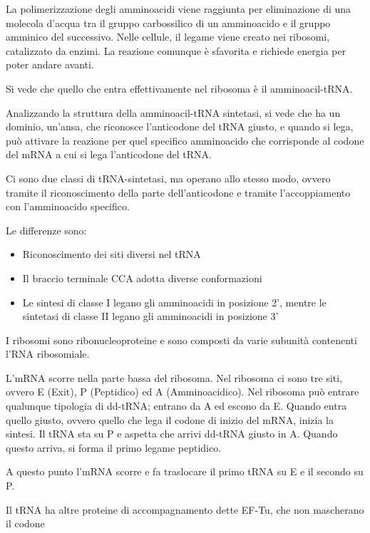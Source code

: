 La polimerizzazione degli amminoacidi viene raggiunta per eliminazione di una molecola d'acqua tra il gruppo carbossilico di un amminoacido e il gruppo amminico del successivo. Nelle cellule, il legame viene creato nei ribosomi, catalizzato da enzimi. La reazione comunque è sfavorita e richiede energia per poter andare avanti.

Si vede che quello che entra effettivamente nel ribosoma è il amminoacil-tRNA.

Analizzando la struttura della amminoacil-tRNA sintetasi, si vede che ha un dominio, un'ansa, che riconosce l'anticodone del tRNA giusto, e quando si lega, può attivare la reazione per quel specifico amminoacido che corrisponde al codone del mRNA a cui si lega l'anticodone del tRNA.

Ci sono due classi di tRNA-sintetasi, ma operano allo stesso modo, ovvero tramite il riconoscimento della parte dell'anticodone e tramite l'accoppiamento con l'amminoacido specifico.

\clearpage

Le differenze sono:
\begin{itemize}
\item Riconoscimento dei siti diversi nel tRNA
\item Il braccio terminale CCA adotta diverse conformazioni
\item Le sintesi di classe I legano gli amminoacidi in posizione 2', mentre le sintetasi di classe II legano gli amminoacidi in posizione 3'
\end{itemize}

I ribosomi sono ribonucleoproteine e sono composti da varie subunità contenenti l'RNA ribosomiale.

L'mRNA scorre nella parte bassa del ribosoma. Nel ribosoma ci sono tre siti, ovvero E (Exit), P (Peptidico) ed A (Amminoacidico). Nel ribosoma può entrare qualunque tipologia di dd-tRNA; entrano da A ed escono da E. Quando entra quello giusto, ovvero quello che lega il codone di inizio del mRNA, inizia la sintesi. Il tRNA sta su P e aspetta che arrivi dd-tRNA giusto in A. Quando questo arriva, si forma il primo legame peptidico.

A questo punto l'mRNA scorre e fa traslocare il primo tRNA su E e il secondo su P.

Il tRNA ha altre proteine di accompagnamento dette EF-Tu, che non mascherano il codone



